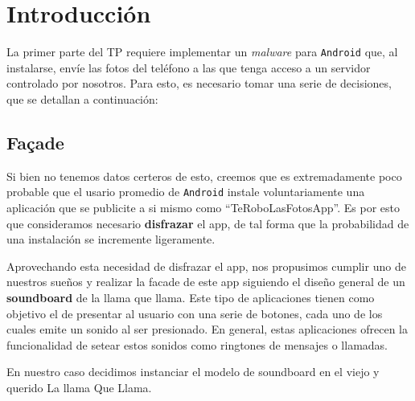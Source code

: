 \documentclass[10pt, a4paper,english,spanish]{article}
\renewcommand{\emph}[1]{\textit{#1}}
\begin{document}

\maketitle
\pagebreak

\tableofcontents
\pagebreak

\section{Introducción} %
\label{sec:introducci_n}

La primer parte del TP requiere implementar un \emph{malware} para \texttt{Android} que, al instalarse, envíe las fotos del teléfono a las que tenga acceso a un servidor controlado por nosotros. Para esto, es necesario tomar una serie de decisiones, que se detallan a continuación:

\subsection{Façade} %
\label{sub:fa_ade}
Si bien no tenemos datos certeros de esto, creemos que es extremadamente poco probable que el usario promedio de \texttt{Android} instale voluntariamente una aplicación que se publicite a si mismo como ``TeRoboLasFotosApp''. Es por esto que consideramos necesario \textbf{disfrazar} el app, de tal forma que la probabilidad de una instalación se incremente ligeramente. 

Aprovechando esta necesidad de disfrazar el app, nos propusimos cumplir uno de nuestros sueños y realizar la facade de este app siguiendo el diseño general de un \textbf{soundboard} de la llama que llama. Este tipo de aplicaciones tienen como objetivo el de presentar al usuario con una serie de botones, cada uno de los cuales emite un sonido al ser presionado. En general, estas aplicaciones ofrecen la funcionalidad de setear estos sonidos como ringtones de mensajes o llamadas.

En nuestro caso decidimos instanciar el modelo de soundboard en el viejo y querido La llama Que Llama. 
\end{document}

